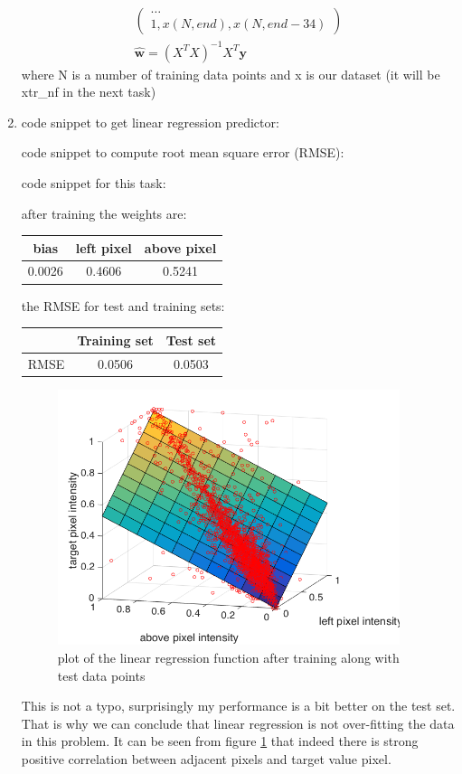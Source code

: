 \documentclass{article}
\newcommand{\vect}[1]{\boldsymbol{#1}} %
\begin{document}
\begin{enumerate}[label=(\alph*)]
\begin{gather*}
\begin{pmatrix}
						\ldots \\
						1, x(N, end), x(N, end -34)
						\end{pmatrix} \\
						\hat{\vect{w}} = (X^T X)^{-1} X^T \vect{y}
					\end{gather*}
					where N is a number of training data points and x is our dataset (it will be xtr\_nf in the next task)
				\item
					code snippet to get linear regression predictor:
					 
					code snippet to compute root mean square error (RMSE):
					
					code snippet for this task:
					
					after training the weights are:
					\begin{center}
						\begin{tabular}{| c | c | c |}
							\hline
							bias & left pixel & above pixel \\ \hline
							0.0026  & 0.4606 & 0.5241 \\ 
							\hline
						\end{tabular}
					\end{center}					
					the RMSE for test and training sets:
					\begin{center}
						\begin{tabular}{| c | c | c |}
							\hline
							\, & Training set & Test set \\ \hline
							RMSE  & 0.0506 & 0.0503 \\ 
							\hline
						\end{tabular}
					\end{center}
				 	\begin{figure}[t]
				 		\centering
				 		\includegraphics[width=10cm]{images/p1-2-c}
				 		\caption{plot of the linear regression function after training along with test data points}
				 		\label{fig:p1-2-c}
				 	\end{figure}
					This is not a typo, surprisingly my performance is a bit better on the test set. That is why we can conclude that linear regression is not over-fitting the data in this problem. It can be seen from figure \ref{fig:p1-2-c} that indeed there is strong positive correlation between adjacent pixels and target value pixel. 
			\end{enumerate}
\end{document}
